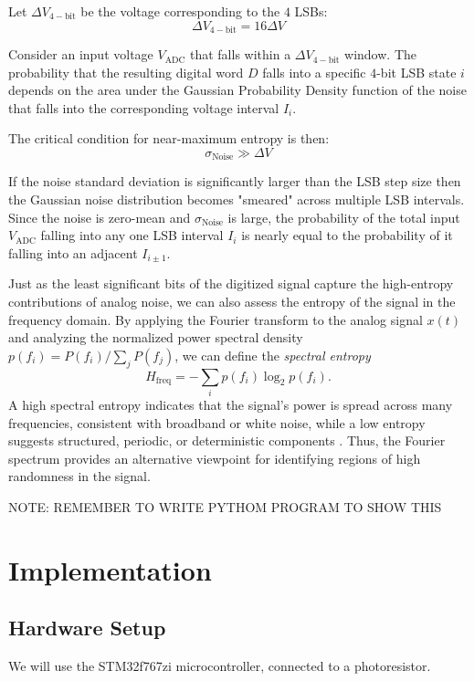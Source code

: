 Let \(\Delta V_{4-\text{bit}}\) be the voltage corresponding to 
the \(4\) LSBs: 
\[ 
    \Delta V_{4-\text{bit}} = 16\Delta V
\]

Consider an input voltage \(V_{\text{ADC}}\) that falls within 
a \(\Delta V_{4-\text{bit}}\) window. The probability that 
the resulting digital word \(D\) falls into a specific \(4\)-bit 
LSB state \(i\) depends on the area under the Gaussian Probability 
Density function of the noise that falls into the corresponding 
voltage interval \(I_i\). 

The critical condition for near-maximum entropy is then: 
\[ 
    \sigma_{\text{Noise}} \gg \Delta V
\]

If the noise standard deviation is significantly larger than 
the LSB step size then the Gaussian noise distribution becomes 
"smeared" across multiple LSB intervals. Since the noise is 
zero-mean and \(\sigma_{\text{Noise}}\) is large, the probability 
of the total input \(V_{\text{ADC}}\) falling into any one 
LSB interval \(I_i\) is nearly equal to the probability of 
it falling into an adjacent \(I_{i \pm 1}\). 



Just as the least significant bits of the digitized signal capture the high-entropy contributions of analog noise, 
we can also assess the entropy of the signal in the frequency domain. 
By applying the Fourier transform to the analog signal \(x(t)\) and analyzing the normalized power spectral density 
\(p(f_i) = P(f_i) / \sum_j P(f_j)\), we can define the \textit{spectral entropy}
\[
H_{\text{freq}} = - \sum_i p(f_i) \log_2 p(f_i).
\]
A high spectral entropy indicates that the signal’s power is spread across many frequencies, 
consistent with broadband or white noise, while a low entropy suggests structured, 
periodic, or deterministic components \cite{Inouye1991}. 
Thus, the Fourier spectrum provides an alternative viewpoint for identifying regions of high randomness in the signal.

NOTE: REMEMBER TO WRITE PYTHOM PROGRAM TO SHOW THIS

\newpage
\section{Implementation}
\subsection{Hardware Setup}
We will use the STM32f767zi microcontroller, connected to a 
photoresistor.

